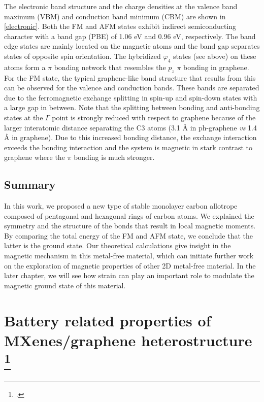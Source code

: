 The electronic band structure and the charge densities at the valence band maximum (VBM) and conduction band minimum (CBM) are shown in \autoref{electronic}. Both the FM and AFM states exhibit indirect semiconducting character with a band gap (PBE) of 1.06 eV and 0.96 eV, respectively. The band edge states are mainly located on the magnetic atoms and the band gap separates states of opposite spin orientation. The hybridized $\varphi_4$ states (see above) on these atoms form a $\pi$ bonding network that resembles the $p_z$ $\pi$ bonding in graphene. For the FM state, the typical graphene-like band structure that results from this can be observed for the valence and conduction bands. These bands are separated due to the ferromagnetic exchange splitting in spin-up and spin-down states with a large gap in between. Note that the splitting between bonding and anti-bonding states at the $\Gamma$ point is strongly reduced with respect to graphene because of the larger interatomic distance separating the C3 atoms (3.1 {\AA} in ph-graphene \textit{vs} 1.4 {\AA} in graphene). Due to this increased bonding distance, the exchange interaction exceeds the bonding interaction and the system is magnetic in stark contrast to graphene where the $\pi$ bonding is much stronger.

\subsection{Summary}
In this work, we proposed a new type of stable monolayer carbon allotrope composed of pentagonal and hexagonal rings of carbon atoms. We explained the symmetry and the structure of the bonds that result in local magnetic moments. By comparing the total energy of the FM and AFM state, we conclude that the latter is the ground state. Our theoretical calculations give insight in the magnetic mechanism in this metal-free material, which can initiate further work on the exploration of magnetic properties of other 2D metal-free material. In the later chapter, we will see how strain can play an important role to modulate the magnetic ground state of this material.


\section[Battery related properties of MXenes/graphene heterostructure]{Battery related properties of MXenes/graphene heterostructure \footcite[This work will be published as:][]{Aierken2017.battery}}

